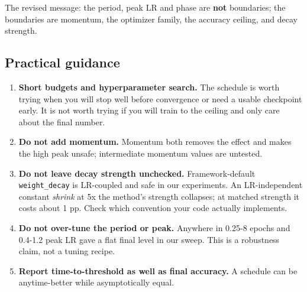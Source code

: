 \documentclass[11pt,a4paper]{article}
\begin{document}
The revised message: the period, peak LR and phase are \textbf{not} boundaries; the boundaries are momentum, the optimizer family, the accuracy ceiling, and decay strength.

\subsection{Practical guidance}
\begin{enumerate}
\item \textbf{Short budgets and hyperparameter search.} The schedule is worth trying when you will stop well before convergence or need a usable checkpoint early. It is not worth trying if you will train to the ceiling and only care about the final number.
\item \textbf{Do not add momentum.} Momentum both removes the effect and makes the high peak unsafe; intermediate momentum values are untested.
\item \textbf{Do not leave decay strength unchecked.} Framework-default \texttt{weight\_decay} is LR-coupled and safe in our experiments. An LR-independent constant \textit{shrink} at 5x the method's strength collapses; at matched strength it costs about 1 pp. Check which convention your code actually implements.
\item \textbf{Do not over-tune the period or peak.} Anywhere in 0.25-8 epochs and 0.4-1.2 peak LR gave a flat final level in our sweep. This is a robustness claim, not a tuning recipe.
\item \textbf{Report time-to-threshold as well as final accuracy.} A schedule can be anytime-better while asymptotically equal.
\end{enumerate}
\end{document}

